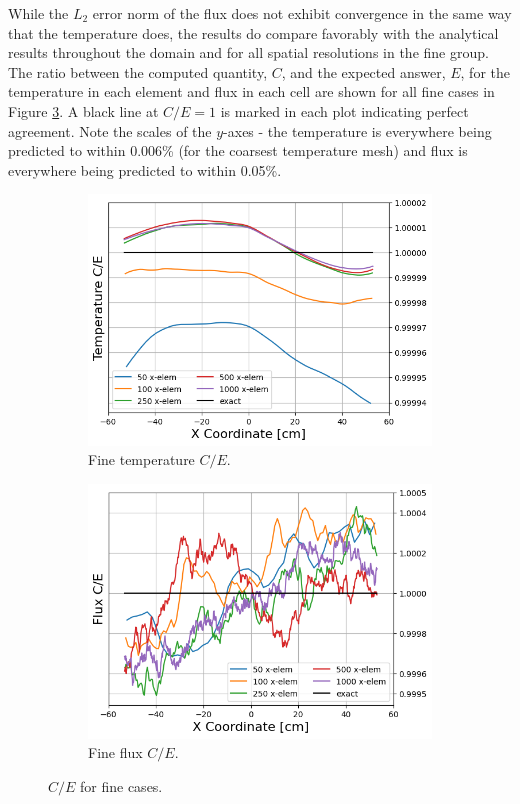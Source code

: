 \documentclass[letterpaper]{mc2023}
\begin{document}
While the $L_2$ error norm of the flux does not exhibit convergence in the same way that the temperature does, the results do compare favorably
with the analytical results throughout the domain and for all spatial resolutions in the fine group. The ratio between the computed quantity,
$C$, and the expected answer, $E$, for the temperature in each element and flux in each cell are shown for all fine cases in Figure \ref{fig:fine_ce}.
A black line at $C/E = 1$ is marked in each plot indicating perfect agreement. Note the scales of the $y$-axes - the temperature is everywhere
being predicted to within 0.006\% (for the coarsest temperature mesh) and flux is everywhere being predicted to within 0.05\%.
\begin{figure}[H]
    \centering
    \begin{subfigure}{0.45\linewidth}
        \includegraphics[width=\linewidth]{figures/fine_temp_num_to_analy_ratios.png}
        \caption{Fine temperature $C/E$.}
        \label{fig:fine_temp_ce}
    \end{subfigure}
    \begin{subfigure}{0.45\linewidth}
        \includegraphics[width=\linewidth]{figures/fine_flux_num_to_analy_ratios.png}
        \caption{Fine flux $C/E$.}
        \label{fig:fine_flux_ce}
    \end{subfigure}
    \par\bigskip
    \caption{$C/E$ for fine cases.}
    \label{fig:fine_ce}
\end{figure}
\end{document}
